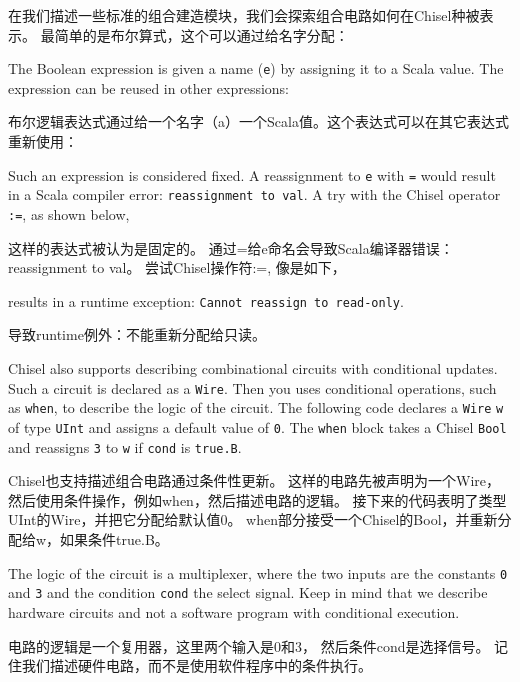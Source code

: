\documentclass[%
    10pt,
    headinclude, footexclude,
    openright, %
    notitlepage,
    cleardoubleempty,
    headsepline,
    pointlessnumbers,
    bibtotoc, idxtotoc,
    ]{scrbook}
\newcommand{\code}[1]{{\small{\texttt{#1}}}}
\begin{document}
在我们描述一些标准的组合建造模块，我们会探索组合电路如何在Chisel种被表示。
最简单的是布尔算式，这个可以通过给名字分配：


\noindent The Boolean expression is given a name (\code{e}) by assigning it
to a Scala value. The expression can be reused in other expressions:

布尔逻辑表达式通过给一个名字（a）一个Scala值。这个表达式可以在其它表达式重新使用：


Such an expression is considered fixed. A reassignment to \code{e}
with \code{=} would result in a Scala compiler error: \code{reassignment to val}.
A try with the Chisel operator \code{:=}, as shown below,

这样的表达式被认为是固定的。
通过=给e命名会导致Scala编译器错误：reassignment to val。
尝试Chisel操作符:=, 像是如下，


\noindent results in a runtime exception: \code{Cannot reassign to read-only}.

导致runtime例外：不能重新分配给只读。

Chisel also supports describing combinational circuits with conditional updates.
Such a circuit is declared as a \code{Wire}. Then you uses conditional operations,
such as \code{when}, to describe the logic of the circuit.
The following code declares a \code{Wire} \code{w} of type \code{UInt} and assigns a default
value of \code{0}. The \code{when} block takes a Chisel \code{Bool} and reassigns
\code{3} to \code{w} if \code{cond} is \code{true.B}.

Chisel也支持描述组合电路通过条件性更新。
这样的电路先被声明为一个Wire，然后使用条件操作，例如when，然后描述电路的逻辑。
接下来的代码表明了类型UInt的Wire，并把它分配给默认值0。
when部分接受一个Chisel的Bool，并重新分配给w，如果条件true.B。


\noindent The logic of the circuit is a multiplexer, where the two inputs are the constants
\code{0} and \code{3} and the condition \code{cond} the select signal.
Keep in mind that we describe hardware circuits and not a software program with conditional
execution.

电路的逻辑是一个复用器，这里两个输入是0和3， 然后条件cond是选择信号。
记住我们描述硬件电路，而不是使用软件程序中的条件执行。
\end{document}
